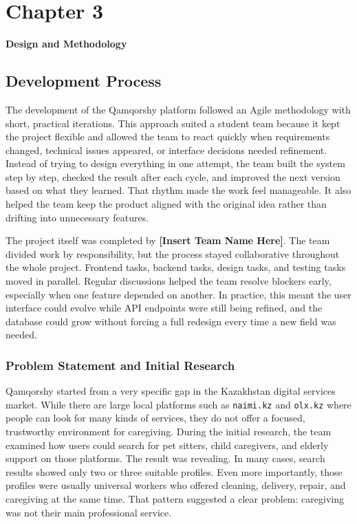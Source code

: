 \documentclass[12pt,a4paper]{article}
\begin{document}
\section*{Chapter 3}

\begin{center}
    {\Large \textbf{Design and Methodology}}
\end{center}

\subsection{Development Process}

The development of the Qamqorshy platform followed an Agile methodology with short, practical iterations. This approach suited a student team because it kept the project flexible and allowed the team to react quickly when requirements changed, technical issues appeared, or interface decisions needed refinement. Instead of trying to design everything in one attempt, the team built the system step by step, checked the result after each cycle, and improved the next version based on what they learned. That rhythm made the work feel manageable. It also helped the team keep the product aligned with the original idea rather than drifting into unnecessary features.

The project itself was completed by \textbf{[Insert Team Name Here]}. The team divided work by responsibility, but the process stayed collaborative throughout the whole project. Frontend tasks, backend tasks, design tasks, and testing tasks moved in parallel. Regular discussions helped the team resolve blockers early, especially when one feature depended on another. In practice, this meant the user interface could evolve while API endpoints were still being refined, and the database could grow without forcing a full redesign every time a new field was needed.

\subsubsection{Problem Statement and Initial Research}

Qamqorshy started from a very specific gap in the Kazakhstan digital services market. While there are large local platforms such as \texttt{naimi.kz} and \texttt{olx.kz} where people can look for many kinds of services, they do not offer a focused, trustworthy environment for caregiving. During the initial research, the team examined how users could search for pet sitters, child caregivers, and elderly support on those platforms. The result was revealing. In many cases, search results showed only two or three suitable profiles. Even more importantly, those profiles were usually universal workers who offered cleaning, delivery, repair, and caregiving at the same time. That pattern suggested a clear problem: caregiving was not their main professional service.
\end{document}
